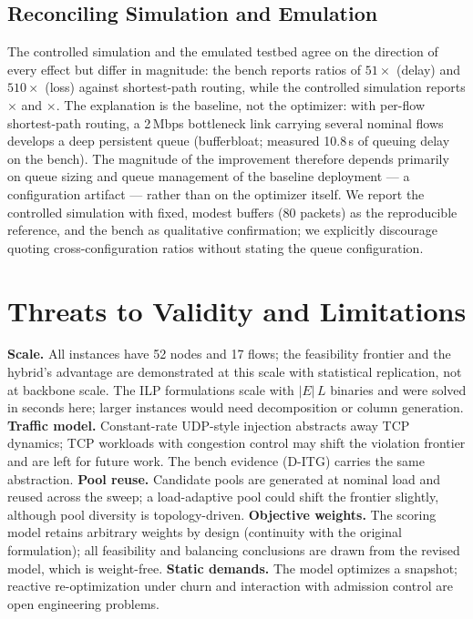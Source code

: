 \documentclass[journal]{IEEEtran}
\begin{document}
\begin{table}[!t]
\caption{Median wall-clock runtime per complete routing decision (s).}
\label{tab:time}
\centering

\end{table}

\subsection{Reconciling Simulation and Emulation}
\label{sec:bench}
The controlled simulation and the emulated testbed agree on the direction of
every effect but differ in magnitude: the bench reports ratios of $51\times$
(delay) and $510\times$ (loss) against shortest-path routing, while the
controlled simulation reports \SimDelayRatio$\times$ and \SimLossRatio$\times$.
The explanation is the baseline, not the optimizer: with per-flow
shortest-path routing, a 2\,Mbps bottleneck link carrying several nominal
flows develops a deep persistent queue (bufferbloat; measured 10.8\,s of
queuing delay on the bench). The magnitude of the improvement therefore
depends primarily on queue sizing and queue management of the baseline
deployment --- a configuration artifact --- rather than on the optimizer
itself. We report the controlled simulation with fixed, modest buffers
(80 packets) as the reproducible reference, and the bench as qualitative
confirmation; we explicitly discourage quoting cross-configuration ratios
without stating the queue configuration.

\section{Threats to Validity and Limitations}
\label{sec:limits}
\textbf{Scale.} All instances have 52 nodes and 17 flows; the feasibility
frontier and the hybrid's advantage are demonstrated at this scale with
statistical replication, not at backbone scale. The ILP formulations scale
with $|E|\,L$ binaries and were solved in seconds here; larger instances
would need decomposition or column generation.
\textbf{Traffic model.} Constant-rate UDP-style injection abstracts away TCP
dynamics; TCP workloads with congestion control may shift the violation
frontier and are left for future work. The bench evidence (D-ITG) carries
the same abstraction.
\textbf{Pool reuse.} Candidate pools are generated at nominal load and
reused across the sweep; a load-adaptive pool could shift the frontier
slightly, although pool diversity is topology-driven.
\textbf{Objective weights.} The scoring model retains arbitrary weights by
design (continuity with the original formulation); all feasibility and
balancing conclusions are drawn from the revised model, which is
weight-free.
\textbf{Static demands.} The model optimizes a snapshot; reactive
re-optimization under churn and interaction with admission control are open
engineering problems.
\end{document}
